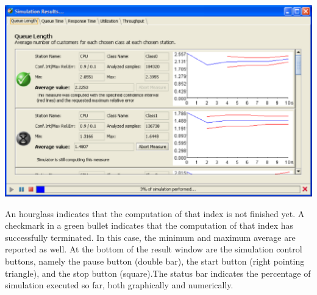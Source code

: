 \begin{center}
\includegraphics[scale=.5]{img/jsim/running.eps}
\end{center}
An hourglass indicates that the computation of that index is not finished yet. A checkmark in a green bullet indicates that the computation of that index has successfully terminated. In this case, the minimum and maximum average are reported as well.
At the bottom of the result window are the simulation control buttons, namely the pause button (double bar), the start button (right pointing triangle), and the stop button (square).The status bar indicates the percentage of simulation executed so far, both graphically and numerically.

